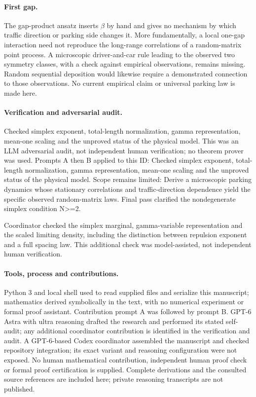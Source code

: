 \documentclass[11pt]{article}
\begin{document}
\paragraph{First gap.}The gap-product ansatz inserts \(\beta\) by hand and gives no mechanism by which traffic direction or parking side changes it. More fundamentally, a local one-gap interaction need not reproduce the long-range correlations of a random-matrix point process. A microscopic driver-and-car rule leading to the observed two symmetry classes, with a check against empirical observations, remains missing. Random sequential deposition would likewise require a demonstrated connection to those observations. No current empirical claim or universal parking law is made here.

\paragraph{Verification and adversarial audit.}
Checked simplex exponent, total-length normalization, gamma representation, mean-one scaling and the unproved status of the physical model. This was an LLM adversarial audit, not independent human verification; no theorem prover was used. Prompts A then B applied to this ID: Checked simplex exponent, total-length normalization, gamma representation, mean-one scaling and the unproved status of the physical model. Scope remains limited: Derive a microscopic parking dynamics whose stationary correlations and traffic-direction dependence yield the specific observed random-matrix laws. Final pass clarified the nondegenerate simplex condition N>=2.

Coordinator checked the simplex marginal, gamma-variable representation and the scaled limiting density, including the distinction between repulsion exponent and a full spacing law. This additional check was model-assisted, not independent human verification.

\paragraph{Tools, process and contributions.}
Python 3 and local shell used to read supplied files and serialize this manuscript; mathematics derived symbolically in the text, with no numerical experiment or formal proof assistant. Contribution prompt A was followed by prompt B. GPT-6 Astra with ultra reasoning drafted the research and performed its stated self-audit; any additional coordinator contribution is identified in the verification and audit. A GPT-6-based Codex coordinator assembled the manuscript and checked repository integration; its exact variant and reasoning configuration were not exposed. No human mathematical contribution, independent human proof check or formal proof certification is supplied. Complete derivations and the consulted source references are included here; private reasoning transcripts are not published.
\end{document}
